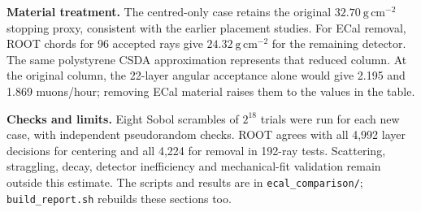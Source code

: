 \textbf{Material treatment.} The centred-only case retains the original
$32.70\ \mathrm{g\,cm^{-2}}$ stopping proxy, consistent with the earlier placement
studies. For ECal removal, ROOT chords for 96 accepted rays give
$24.32\ \mathrm{g\,cm^{-2}}$ for the remaining detector. The same polystyrene
CSDA approximation represents that reduced column. At the original column,
the 22-layer angular acceptance alone would give 2.195 and 1.869
muons/hour; removing ECal material raises them to the values in the table.

\textbf{Checks and limits.} Eight Sobol scrambles of $2^{18}$ trials were run
for each new case, with independent pseudorandom checks. ROOT agrees with all
4,992 layer decisions for centering and all 4,224 for removal in 192-ray tests.
Scattering, straggling, decay, detector inefficiency and mechanical-fit validation
remain outside this estimate. The scripts and results are in
\texttt{ecal\_comparison/}; \texttt{build\_report.sh} rebuilds these sections too.
